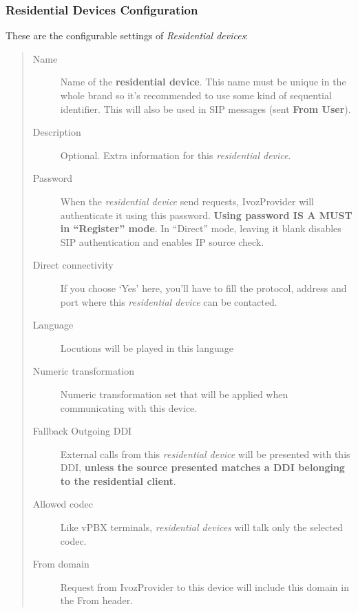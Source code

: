 \documentclass[letterpaper,10pt,spanish]{sphinxmanual}
\begin{document}
\subsubsection{Residential Devices Configuration}
\label{administration_portal/client/residential/residential_devices:residential-devices-configuration}
These are the configurable settings of \emph{Residential devices}:
\begin{quote}
\begin{description}
\item[{Name}] \leavevmode
Name of the \textbf{residential device}. This name must be unique in the whole brand so
it's recommended to use some kind of sequential identifier. This will also be used
in SIP messages (sent \textbf{From User}).

\item[{Description}] \leavevmode
Optional. Extra information for this \emph{residential device}.

\item[{Password}] \leavevmode
When the \emph{residential device} send requests, IvozProvider will authenticate it using
this password. \textbf{Using password IS A MUST in ``Register'' mode}. In ``Direct'' mode,
leaving it blank disables SIP authentication and enables IP source check.

\item[{Direct connectivity}] \leavevmode
If you choose `Yes' here, you'll have to fill the protocol, address and
port where this \emph{residential device} can be contacted.

\item[{Language}] \leavevmode
Locutions will be played in this language

\item[{Numeric transformation}] \leavevmode
Numeric transformation set that will be applied when communicating with this device.

\item[{Fallback Outgoing DDI}] \leavevmode
External calls from this \emph{residential device} will be presented with this DDI, \textbf{unless
the source presented matches a DDI belonging to the residential client}.

\item[{Allowed codec}] \leavevmode
Like vPBX terminals, \emph{residential devices} will talk only the selected codec.

\item[{From domain}] \leavevmode
Request from IvozProvider to this device will include this domain in
the From header.


\end{description}
\end{quote}
\end{document}
